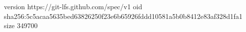 version https://git-lfs.github.com/spec/v1
oid sha256:5c5acaa5635bed63826250f23e6b65926fddd10581a5b0b8412e83af328d1fa1
size 349700
